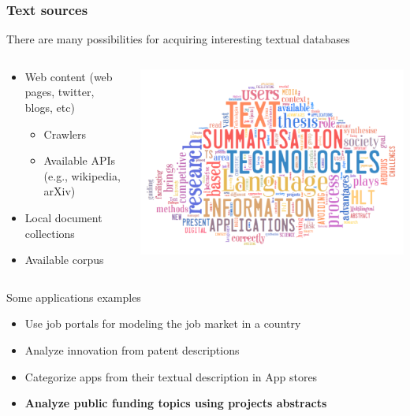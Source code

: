 \documentclass{beamer}
\begin{document}
\begin{frame}

    \frametitle{Text sources}

	There are many possibilities for acquiring interesting textual databases

	\begin{columns}
	
	\begin{column}{.5\textwidth}
		\begin{itemize}
			
			\item Web content (web pages, twitter, blogs, etc)
			\begin{itemize}
				\item Crawlers
				\item Available APIs (e.g., wikipedia, arXiv)
			\end{itemize}
			\item Local document collections
			\item Available corpus	
			
		\end{itemize}
	\end{column}
	
	\begin{column}{.5\textwidth}
		\vspace{.2cm}			\centerline{\includegraphics[width=\textwidth]{./figs/NLPTM_wordcloud2.png}}
	\end{column}

	\end{columns}
	
Some applications examples
\begin{itemize}
\item Use job portals for modeling the job market in a country
\item Analyze innovation from patent descriptions
\item Categorize apps from their textual description in App stores
\item {\bf{Analyze public funding topics using projects abstracts}}
\end{itemize}

\end{frame}
\end{document}
